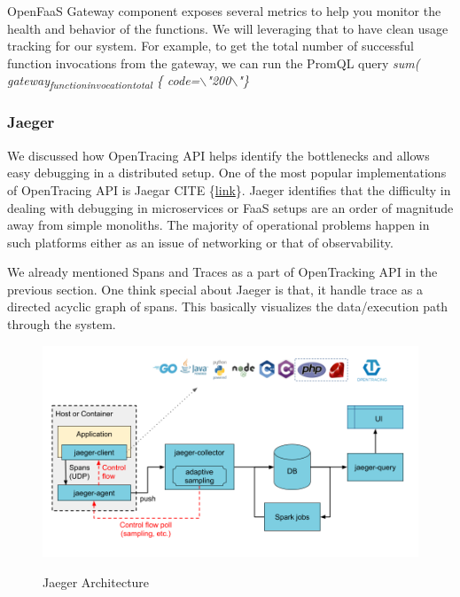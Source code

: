 \documentclass[12pt,titlepage]{article}
\begin{document}
OpenFaaS Gateway component exposes several metrics to help you monitor the
health and behavior of the functions. We will leveraging that to have clean
usage tracking for our system. For example, to get the total number of
successful function invocations from the gateway, we can run the PromQL query
\emph{sum( gateway\textsubscript{function}\textsubscript{invocation}\textsubscript{total} \{  code=$\backslash$"200$\backslash$"\}}



\subsubsection{Jaeger}
\label{sec:org3e3ebf9}
We discussed how OpenTracing API helps identify the bottlenecks and allows easy
debugging in a distributed setup. One of the most popular implementations of
OpenTracing API is Jaegar CITE \{\href{https://www.jaegertracing.io/}{link}\}. Jaeger identifies that the difficulty in
dealing with debugging in microservices or FaaS setups are an order of magnitude
away from simple monoliths. The majority of operational problems happen in such platforms
either as an issue of networking or that of observability. 

We already mentioned Spans and Traces as a part of OpenTracking API in the
previous section. One think special about Jaeger is that, it handle trace as a
directed acyclic graph of spans. This basically visualizes the data/execution
path through the system.

\begin{figure}[!h]
    \caption{Jaeger Architecture}
    \centering
    \includegraphics[width=130mm]{./thesis_images/jaeger.png}
    \label{fig:jaeger}
\end{figure}
\end{document}
